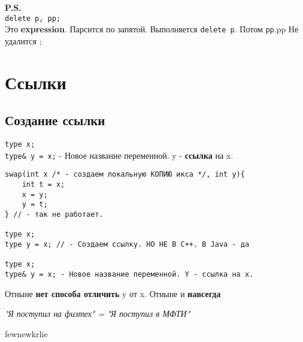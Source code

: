 \documentclass[12pt, a5paper]{article}
\begin{document}
\textbf{P.S.}
\\
\texttt{delete p, pp;}
\\
Это \textbf{expression}. Парсится по запятой. Выполняется \texttt{delete p}. Потом \texttt{pp}.pp Не удалится ;

\section{Ссылки}
\subsection{Создание ссылки}

\texttt{type x;}
\\
\texttt{type\& y = x;} - Новое название переменной. y - \textbf{ссылка} на x.

\begin{lstlisting}
swap(int x /* - создаем локальную КОПИЮ икса */, int y){
	int t = x;
	x = y;
	y = t;
} // - так не работает.

type x;
type y = x; // - Создаем ссылку. НО НЕ В С++. В Java - да 

type x;
type& y = x; - Новое название переменной. Y - ссылка на x. 
\end{lstlisting}
\begin{center}
Отныне \textbf{нет способа отличить} y от x. Отныне и \textbf{навсегда}

\textit{"Я поступил на физтех" = "Я поступил в МФТИ"}

fewnewkrlie


\end{center}
\end{document}
